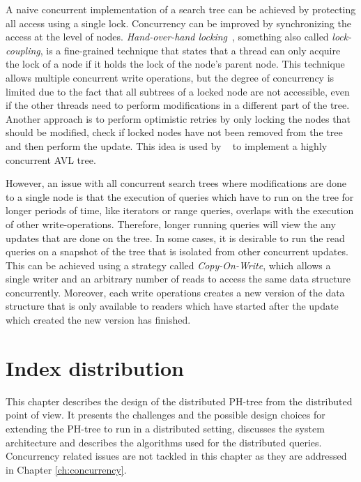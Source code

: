 \documentclass[11pt,a4paper]{globis-book}
\begin{document}
A naive concurrent implementation of a search tree can be achieved by protecting all access using a single lock. Concurrency can be improved by synchronizing the access at the level of nodes. \textit{Hand-over-hand locking}~\cite{shanir04}, something also called \textit{lock-coupling}, is a fine-grained technique that states that a thread can only acquire the lock of a node if it holds the lock of the node's parent node. This technique allows multiple concurrent write operations, but the degree of concurrency is limited due to the fact that all subtrees of a locked node are not accessible, even if the other threads need to perform modifications in a different part of the tree. Another approach is to perform optimistic retries by only locking the nodes that should be modified, check if locked nodes have not been removed from the tree and then perform the update. This idea is used by ~\cite{Bronson2010concurrent} to implement a highly concurrent AVL tree.

However, an issue with all concurrent search trees where modifications are done to a single node is that the execution of queries which have to run on the tree for longer periods of time, like iterators or range queries, overlaps with the execution of other write-operations. Therefore, longer running queries will view the any updates that are done on the tree. In some cases, it is desirable to run the read queries on a snapshot of the tree that is isolated from other concurrent updates. This can be achieved using a strategy called \textit{Copy-On-Write}, which allows a single writer and an arbitrary number of reads to access the same data structure concurrently. Moreover, each write operations creates a new version of the data structure that is only available to readers which have started after the update which created the new version has finished. 

\chapter{Index distribution}
\label{ch:distindex}

This chapter describes the design of the distributed PH-tree from the distributed point of view. It presents the challenges and the possible design choices for extending the PH-tree to run in a distributed setting, discusses the system architecture and describes the algorithms used for the distributed queries. Concurrency related issues are not tackled in this chapter as they are addressed in Chapter \ref{ch:concurrency}.
\end{document}
